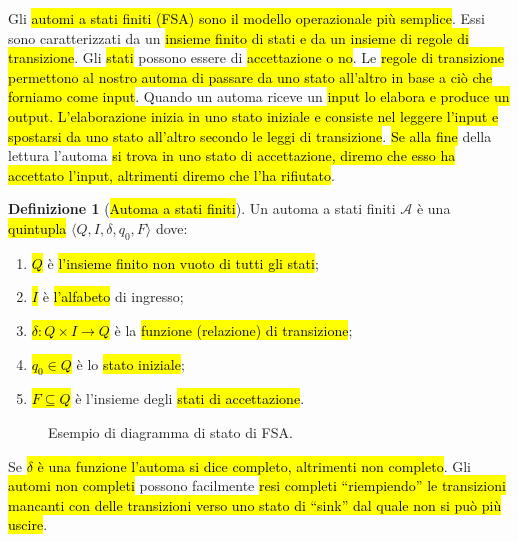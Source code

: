 \documentclass[a4paper,11pt,oneside]{article}
\theoremstyle{plain}
\theoremstyle{definition}
\newtheorem{defn}{Definizione}[section]
\theoremstyle{remark}
\begin{document}
Gli \hl{automi a stati finiti (FSA) sono il modello operazionale più semplice}.
Essi sono caratterizzati da un \hl{insieme finito di stati e da un insieme di
regole di transizione}. Gli \hl{stati} possono essere di \hl{accettazione o no}.
Le \hl{regole di transizione permettono al nostro automa di passare da uno stato
all'altro in base a ciò che forniamo come input}. Quando un automa riceve un
\hl{input lo elabora e produce un output. L'elaborazione inizia in uno stato
iniziale e consiste nel leggere l'input e spostarsi da uno stato all'altro
secondo le leggi di transizione}. \hl{Se alla fine} della lettura l'automa
\hl{si trova in uno stato di accettazione, diremo che esso ha accettato l'input,
altrimenti diremo che l'ha rifiutato}.

\begin{defn}[\hl{Automa a stati finiti}]\label{def:fsa}
  Un automa a stati finiti $\mathcal{A}$ è una \hl{quintupla}
  $\langle Q, I, \delta, q_0, F \rangle$ dove:
  \begin{enumerate}
    \item \hl{$Q$} è \hl{l'insieme finito non vuoto di tutti gli stati};
    \item \hl{$I$} è \hl{l'alfabeto} di ingresso;
    \item \hl{$\delta: Q \times I \to Q$} è la \hl{funzione (relazione) di
      transizione};
    \item \hl{$q_0 \in Q$} è lo \hl{stato iniziale};
    \item \hl{$F \subseteq Q$} è l'insieme degli \hl{stati di accettazione}.
  \end{enumerate}
\end{defn}

\begin{figure}[htb]
  \centering
  \caption{Esempio di diagramma di stato di FSA.}\label{fig:fsa-diagramma-stato}
\end{figure}

Se \hl{$\delta$ è una funzione l'automa si dice completo, altrimenti non
completo}. Gli \hl{automi non completi} possono facilmente \hl{resi completi
``riempiendo'' le transizioni mancanti con delle transizioni verso uno stato di
``sink'' dal quale non si può più uscire}.
\end{document}
